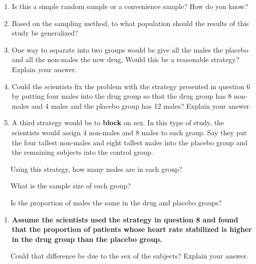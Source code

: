 \documentclass[
]{report}
\providecommand{\tightlist}{%
  \setlength{\itemsep}{0pt}\setlength{\parskip}{0pt}}
\begin{document}
\begin{enumerate}
\def\labelenumi{\arabic{enumi}.}
\setcounter{enumi}{3}
\item
  Is this a simple random sample or a convenience sample? How do you know?
  \vspace{0.5in}
\item
  Based on the sampling method, to what population should the results of this study be generalized?
  \vspace{0.5in}
\item
  One way to separate into two groups would be give all the males the placebo and all the non-males the new drug. Would this be a reasonable strategy? Explain your answer.
  \vspace{1in}
\item
  Could the scientists fix the problem with the strategy presented in question 6 by putting four males into the drug group so that the drug group has 8 non-males and 4 males and the placebo group has 12 males? Explain your answer.
  \vspace{0.5in}
\item
  A third strategy would be to \textbf{block} on sex. In this type of study, the scientists would assign 4 non-males and 8 males to each group. Say they put the four tallest non-males and eight tallest males into the placebo group and the remaining subjects into the control group.
\end{enumerate}

~~~Using this strategy, how many males are in each group?

\vspace{0.1in}

~~~What is the sample size of each group?

\vspace{0.1in}

~~~Is the proportion of males the same in the drug and placebo groups?

\vspace{0.1in}

\begin{enumerate}
\def\labelenumi{\arabic{enumi}.}
\setcounter{enumi}{8}
\tightlist
\item
  \textbf{Assume the scientists used the strategy in question 8 and found that the proportion of patients whose heart rate stabilized is higher in the drug group than the placebo group.}
\end{enumerate}

~~~Could that difference be due to the sex of the subjects? Explain your answer.
\end{document}
